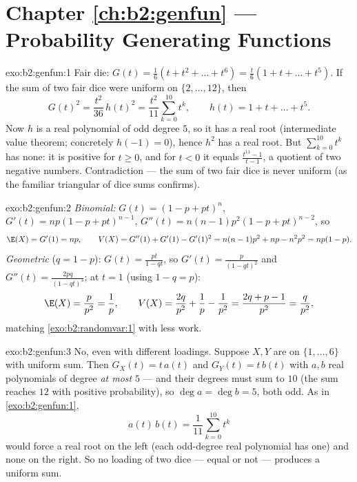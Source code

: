 \section*{Chapter \ref{ch:b2:genfun} --- Probability Generating Functions}

\begin{solution}{exo:b2:genfun:1}
Fair die: $G(t) = \frac16(t + t^2 + \dots + t^6) = \frac t6(1 + t
+ \dots + t^5)$. If the sum of two fair dice were uniform on
$\{2, \dots, 12\}$, then
\[
G(t)^2 = \frac{t^2}{36}\,h(t)^2
= \frac{t^2}{11}\sum_{k=0}^{10}t^k ,
\qquad h(t) = 1 + t + \dots + t^5 .
\]
Now $h$ is a real polynomial of odd degree $5$, so it has a real
root (intermediate value theorem; concretely $h(-1) = 0$), hence
$h^2$ has a real root. But $\sum_{k=0}^{10}t^k$ has none: it is
positive for $t \geq 0$, and for $t < 0$ it equals
$\frac{t^{11} - 1}{t - 1}$, a quotient of two negative numbers.
Contradiction --- the sum of two fair dice is never uniform (as
the familiar triangular  of dice sums confirms).
\end{solution}

\begin{solution}{exo:b2:genfun:2}
\emph{Binomial:} $G(t) = (1 - p + pt)^n$, $G'(t) = np(1 - p +
pt)^{n-1}$, $G''(t) = n(n-1)p^2(1 - p + pt)^{n-2}$, so
\[
\E(X) = G'(1) = np,
\qquad
V(X) = G''(1) + G'(1) - G'(1)^2
= n(n-1)p^2 + np - n^2p^2 = np(1-p).
\]
\emph{Geometric} ($q = 1 - p$): $G(t) = \frac{pt}{1 - qt}$, so
$G'(t) = \frac{p}{(1 - qt)^2}$ and $G''(t) = \frac{2pq}{(1 -
qt)^3}$; at $t = 1$ (using $1 - q = p$):
\[
\E(X) = \frac{p}{p^2} = \frac1p,
\qquad
V(X) = \frac{2q}{p^2} + \frac1p - \frac{1}{p^2}
= \frac{2q + p - 1}{p^2}
= \frac{q}{p^2} ,
\]
matching \cref{exo:b2:randomvar:1} with less work.
\end{solution}

\begin{solution}{exo:b2:genfun:3}
No, even with different loadings. Suppose $X, Y$ are  on
$\{1, \dots, 6\}$ with uniform sum. Then $G_X(t) = t\,a(t)$ and
$G_Y(t) = t\,b(t)$ with $a, b$ real polynomials of degree \emph{at
most} $5$ --- and their degrees must sum to $10$ (the sum reaches
$12$ with positive probability), so $\deg a = \deg b = 5$, both
odd. As in \cref{exo:b2:genfun:1},
\[
a(t)\,b(t) = \frac{1}{11}\sum_{k=0}^{10}t^k
\]
would force a real root on the left (each odd-degree real
polynomial has one) and none on the right. So no loading of two
 dice --- equal or not --- produces a uniform sum.
\end{solution}

